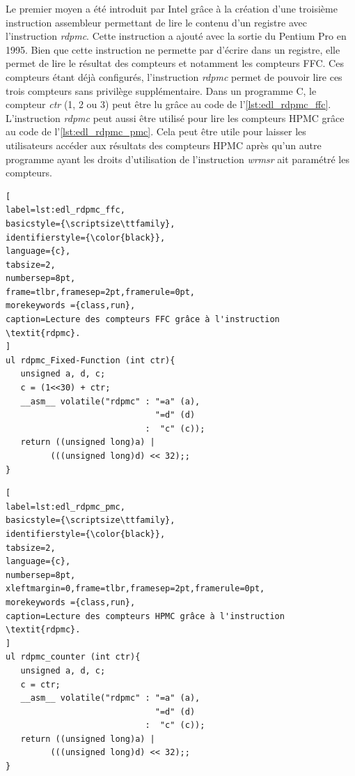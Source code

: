         Le premier moyen a été introduit par Intel grâce à la création d'une troisième instruction assembleur permettant de lire le contenu d'un registre avec l'instruction \textit{rdpmc}. Cette instruction a ajouté avec la sortie du Pentium Pro en 1995. Bien que cette instruction ne permette par d'écrire dans un registre, elle permet de lire le résultat des compteurs et notamment les compteurs FFC. Ces compteurs étant déjà configurés, l'instruction \textit{rdpmc} permet de pouvoir lire ces trois compteurs sans privilège supplémentaire. Dans un programme C, le compteur \textit{ctr} (1, 2 ou 3) peut être lu grâce au code de l'\autoref{lst:edl_rdpmc_ffc}. L'instruction \textit{rdpmc} peut aussi être utilisé pour lire les compteurs HPMC grâce au code de l'\autoref{lst:edl_rdpmc_pmc}. Cela peut être utile pour laisser les utilisateurs accéder aux résultats des compteurs HPMC après qu'un autre programme ayant les droits d'utilisation de l'instruction \textit{wrmsr} ait paramétré les compteurs.

\begin{minipage}{.45\textwidth}
\begin{lstlisting}[
label=lst:edl_rdpmc_ffc,
basicstyle={\scriptsize\ttfamily},
identifierstyle={\color{black}},
language={c},
tabsize=2,
numbersep=8pt,
frame=tlbr,framesep=2pt,framerule=0pt,
morekeywords ={class,run},
caption=Lecture des compteurs FFC grâce à l'instruction \textit{rdpmc}.
]
ul rdpmc_Fixed-Function (int ctr){
   unsigned a, d, c;
   c = (1<<30) + ctr;
   __asm__ volatile("rdpmc" : "=a" (a), 
                              "=d" (d) 
                            :  "c" (c));
   return ((unsigned long)a) | 
         (((unsigned long)d) << 32);;
}
\end{lstlisting}
\end{minipage}%
\hfill
%
\begin{minipage}{.45\textwidth}
\begin{lstlisting}[
label=lst:edl_rdpmc_pmc,
basicstyle={\scriptsize\ttfamily},
identifierstyle={\color{black}},
tabsize=2,
language={c},
numbersep=8pt,
xleftmargin=0,frame=tlbr,framesep=2pt,framerule=0pt,
morekeywords ={class,run},
caption=Lecture des compteurs HPMC grâce à l'instruction \textit{rdpmc}.
]
ul rdpmc_counter (int ctr){
   unsigned a, d, c;
   c = ctr;
   __asm__ volatile("rdpmc" : "=a" (a),
                              "=d" (d)
                            :  "c" (c));
   return ((unsigned long)a) | 
         (((unsigned long)d) << 32);;
}
\end{lstlisting}
\end{minipage}

